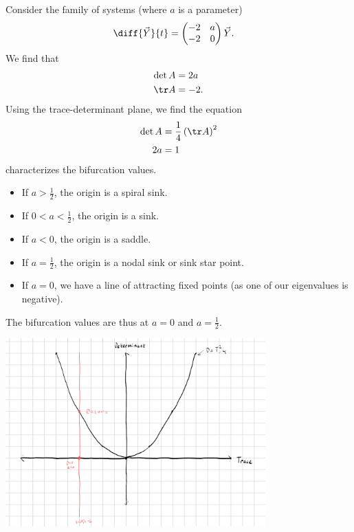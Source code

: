 \documentclass[10pt]{mypackage}
\begin{document}
\begin{example}
  Consider the family of systems (where $a$ is a parameter)
  \begin{align*}
    \diff{\vec{Y}}{t} &= \begin{pmatrix}-2 & a \\ -2 & 0\end{pmatrix} \vec{Y}.
  \end{align*}
  We find that
  \begin{align*}
    \det A &= 2a\\
    \tr A &= -2.
  \end{align*}
  Using the trace-determinant plane, we find the equation
  \begin{align*}
    \det A &= \frac{1}{4}\left(\tr A\right)^2\\
    2a &= 1
  \end{align*}
  characterizes the bifurcation values. 
  \begin{itemize}
    \item If $a > \frac{1}{2}$, the origin is a spiral sink.
    \item If $0 < a < \frac{1}{2}$, the origin is a sink.
    \item If $a < 0$, the origin is a saddle.
    \item If $a = \frac{1}{2}$, the origin is a nodal sink or sink star point.
    \item If $a = 0$, we have a line of attracting fixed points (as one of our eigenvalues is negative).
  \end{itemize}
  The bifurcation values are thus at $a = 0$ and $a = \frac{1}{2}$.
  \begin{center}
    \includegraphics[width=10cm]{images/bifurcation_trace_determinant_1.png}
  \end{center}
\end{example}
\end{document}
